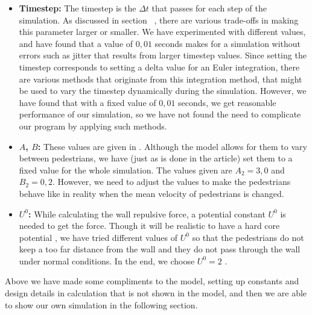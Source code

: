 \begin{itemize}
    \item \textbf{Timestep:} The timestep is the $\Delta t$ that passes for 
        each step of the simulation. As discussed in 
        section~ %
		, there are various trade-offs in making 
        this parameter larger or smaller. We have experimented with different 
        values, and have found that a value of $0,01$ seconds makes for a 
        simulation without errors such as jitter that results from larger 
        timestep values. Since setting the timestep corresponds to setting a 
        delta value for an Euler integration, there are various methods that 
        originate from this integration method, that might be used to vary the 
        timestep dynamically during the simulation. 
         However, we have found 
        that with a fixed value of $0,01$ seconds, we get reasonable 
        performance of our simulation, so we have not found the need to 
        complicate our program by applying such methods.

    \item \textbf{$A$, $B$:} These values are given in \cite{ABconstant}. 
        Although the model allows for them to vary between pedestrians, we have 
        (just as is done in the article) set them to a fixed value for the 
        whole simulation. The values given are $A_2=3,0$ and $B_2 = 0,2$. However, 
        we need to adjust the values to make the pedestrians behave like in reality 
        when the mean velocity of pedestrians is changed.

    \item \textbf{$ U^{0} $:} While calculating the wall repulsive force, a potential
        constant $ U^{0} $ is needed to get the force. Though it will be realistic to 
        have a hard core potential \cite{self-org}, we have tried different values 
        of $ U^{0} $ so that the pedestrians do not keep a too far distance from the wall 
        and they do not pass through the wall under normal conditions. In the end, 
        we choose $ U^{0} =2 $ .
 
\end{itemize}

Above we have made some compliments to the model, setting up constants and 
design details in calculation that is not shown in the model, and then we are able to  
show our own simulation in the following section.
